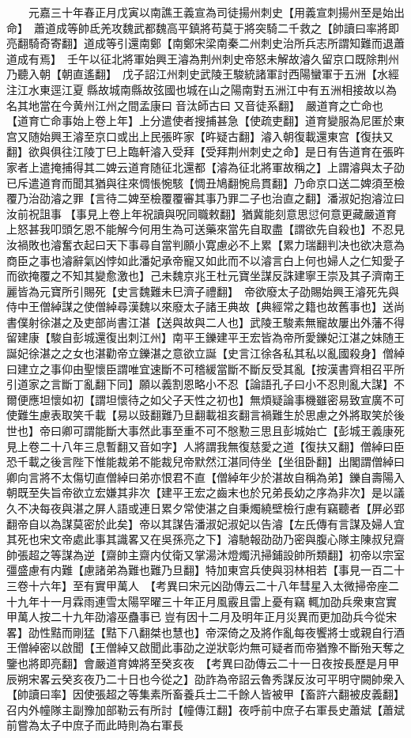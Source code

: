 　　元嘉三十年春正月戊寅以南譙王義宣為司徒揚州刺史【用義宣刺揚州至是始出命】　蕭道成等帥氐羌攻魏武都魏高平鎮將苟莫于將突騎二千救之【帥讀曰率將即亮翻騎奇寄翻】道成等引還南鄭【南鄭宋梁南秦二州刺史治所兵志所謂知難而退蕭道成有焉】　壬午以征北將軍始興王濬為荆州刺史帝怒未解故濬久留京口既除荆州乃聽入朝【朝直遙翻】　戊子詔江州刺史武陵王駿統諸軍討西陽蠻軍于五洲【水經注江水東逕江夏縣故城南縣故弦國也城在山之陽南對五洲江中有五洲相接故以為名其地當在今黄州江州之間孟康曰音汰師古曰又音徒系翻】　嚴道育之亡命也【道育亡命事始上卷上年】上分遣使者搜捕甚急【使疏吏翻】道育變服為尼匿於東宫又随始興王濬至京口或出上民張旿家【旿疑古翻】濬入朝復載還東宫【復扶又翻】欲與俱往江陵丁巳上臨軒濬入受拜【受拜荆州刺史之命】是日有告道育在張旿家者上遣掩捕得其二婢云道育随征北還都【濬為征北將軍故稱之】上謂濬與太子劭已斥遣道育而聞其猶與往來惆悵惋駭【惆丑鳩翻惋烏貫翻】乃命京口送二婢須至檢覆乃治劭濬之罪【言待二婢至檢覆覆審其事乃罪二子也治直之翻】潘淑妃抱濬泣曰汝前祝詛事【事見上卷上年祝讀與呪同職敕翻】猶冀能刻意思愆何意更藏嚴道育上怒甚我叩頭乞恩不能解今何用生為可送藥來當先自取盡【謂欲先自殺也】不忍見汝禍敗也濬奮衣起曰天下事尋自當判願小寛慮必不上累【累力瑞翻判决也欲决意為商臣之事也濬辭氣凶悖如此潘妃承帝寵又如此而不以濬言白上何也婦人之仁知愛子而欲掩覆之不知其變愈激也】己未魏京兆王杜元寶坐謀反誅建寧王崇及其子濟南王麗皆為元寶所引賜死【史言魏難未巳濟子禮翻】　帝欲廢太子劭賜始興王濬死先與侍中王僧綽謀之使僧綽尋漢魏以來廢太子諸王典故【典經常之籍也故舊事也】送尚書僕射徐湛之及吏部尚書江湛【送與故與二人也】武陵王駿素無寵故屢出外藩不得留建康【駿自彭城還復出刺江州】南平王鑠建平王宏皆為帝所愛鑠妃江湛之妹随王誕妃徐湛之之女也湛勸帝立鑠湛之意欲立誕【史言江徐各私其私以亂國殺身】僧綽曰建立之事仰由聖懷臣謂唯宜速斷不可稽緩當斷不斷反受其亂【按漢書齊相召平所引道家之言斷丁亂翻下同】願以義割恩略小不忍【論語孔子曰小不忍則亂大謀】不爾便應坦懷如初【謂坦懷待之如父子天性之初也】無煩疑論事機雖密易致宣廣不可使難生慮表取笑千載【易以豉翻難乃旦翻載祖亥翻言禍難生於思慮之外將取笑於後世也】帝曰卿可謂能斷大事然此事至重不可不慇懃三思且彭城始亡【彭城王義康死見上卷二十八年三息暫翻又音如字】人將謂我無復慈愛之道【復扶又翻】僧綽曰臣恐千載之後言陛下惟能裁弟不能裁兒帝默然江湛同侍坐【坐徂卧翻】出閣謂僧綽曰卿向言將不太傷切直僧綽曰弟亦恨君不直【僧綽年少於湛故自稱為弟】鑠自壽陽入朝既至失旨帝欲立宏嫌其非次【建平王宏之齒末也於兄弟長幼之序為非次】是以議久不决每夜與湛之屏人語或連日累夕常使湛之自秉燭繞壁檢行慮有竊聽者【屏必郢翻帝自以為謀莫密於此矣】帝以其謀告潘淑妃淑妃以告濬【左氏傳有言謀及婦人宜其死也宋文帝處此事其識畧又在吳孫亮之下】濬馳報劭劭乃密與腹心隊主陳叔兒齋帥張超之等謀為逆【齋帥主齋内仗衛又掌湯沐燈燭汛掃鋪設帥所類翻】初帝以宗室彊盛慮有内難【慮諸弟為難也難乃旦翻】特加東宫兵使與羽林相若【事見一百二十三卷十六年】至有實甲萬人　【考異曰宋元凶劭傳云二十八年彗星入太微掃帝座二十九年十一月霖雨連雪太陽罕曜三十年正月風霰且雷上憂有竊輒加劭兵衆東宫實甲萬人按二十九年劭濬巫蠱事已豈有因十二月及明年正月災異而更加劭兵今從宋畧】劭性黠而剛猛【黠下八翻桀也慧也】帝深倚之及將作亂每夜饗將士或親自行酒王僧綽密以啟聞【王僧綽又啟聞此事劭之逆狀彰灼無可疑者而帝猶豫不斷殆天奪之鑒也將即亮翻】會嚴道育婢將至癸亥夜　【考異曰劭傳云二十一日夜按長歷是月甲辰朔宋畧云癸亥夜乃二十日也今從之】劭詐為帝詔云魯秀謀反汝可平明守闕帥衆入【帥讀曰率】因使張超之等集素所畜養兵士二千餘人皆被甲【畜許六翻被皮義翻】召内外幢隊主副豫加部勒云有所討【幢傳江翻】夜呼前中庶子右軍長史蕭斌【蕭斌前嘗為太子中庶子而此時則為右軍長